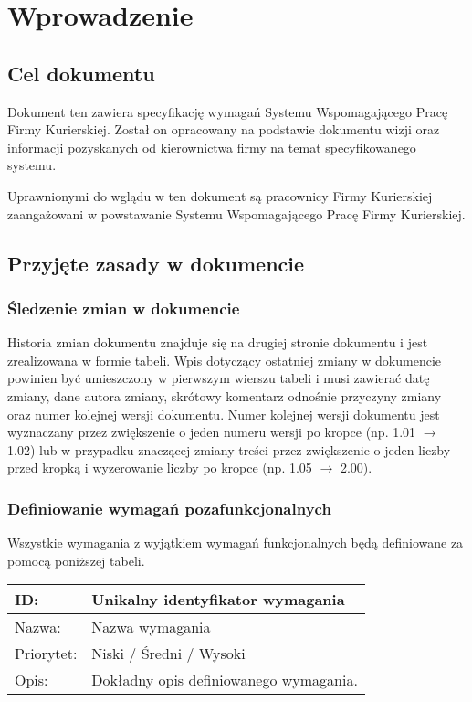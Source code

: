 \section{Wprowadzenie}

\subsection{Cel dokumentu}
Dokument ten zawiera specyfikację wymagań Systemu Wspomagającego Pracę Firmy Kurierskiej. Został on opracowany na podstawie dokumentu wizji oraz informacji pozyskanych od kierownictwa firmy na temat specyfikowanego systemu.

Uprawnionymi do wglądu w ten dokument są pracownicy Firmy Kurierskiej zaangażowani w powstawanie Systemu Wspomagającego Pracę Firmy Kurierskiej. 

\subsection{Przyjęte zasady w dokumencie}
\subsubsection*{Śledzenie zmian w dokumencie}
Historia zmian dokumentu znajduje się na drugiej stronie dokumentu i jest zrealizowana w formie tabeli. Wpis dotyczący ostatniej zmiany w dokumencie powinien być umieszczony w pierwszym wierszu tabeli i musi zawierać datę zmiany, dane autora zmiany, skrótowy komentarz odnośnie przyczyny zmiany oraz numer kolejnej wersji dokumentu. Numer kolejnej wersji dokumentu jest wyznaczany przez zwiększenie o jeden numeru wersji po kropce (np. 1.01 $\rightarrow$ 1.02) lub w przypadku znaczącej zmiany treści przez zwiększenie o jeden liczby przed kropką i wyzerowanie liczby po kropce (np. 1.05 $\rightarrow$ 2.00).

\subsubsection*{Definiowanie wymagań pozafunkcjonalnych}
Wszystkie wymagania z wyjątkiem wymagań funkcjonalnych będą definiowane za pomocą poniższej tabeli.
\begin{center}
\begin{tabular}[h]{|p{1.6cm}|p{13.5cm}|}
\hline
ID: & Unikalny identyfikator wymagania \\ \hline
Nazwa: & Nazwa wymagania \\ \hline
Priorytet: & Niski / Średni / Wysoki \\ \hline
Opis: & Dokładny opis definiowanego wymagania. \\
\hline
\end{tabular}
\end{center}

